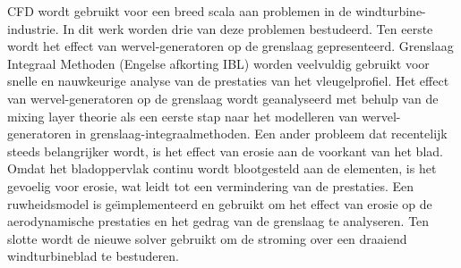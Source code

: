 {CFD wordt gebruikt voor een breed scala aan problemen in de windturbine-industrie. In dit werk worden drie van deze problemen bestudeerd. Ten eerste wordt het effect van wervel-generatoren op de grenslaag gepresenteerd. Grenslaag Integraal Methoden (Engelse afkorting IBL) worden veelvuldig gebruikt voor snelle en nauwkeurige analyse van de prestaties van het vleugelprofiel. Het effect van wervel-generatoren op de grenslaag wordt geanalyseerd met behulp van de mixing layer theorie als een eerste stap naar het modelleren van wervel-generatoren in grenslaag-integraalmethoden. Een ander probleem dat recentelijk steeds belangrijker wordt, is het effect van erosie aan de voorkant van het blad. Omdat het bladoppervlak continu wordt blootgesteld aan de elementen, is het gevoelig voor erosie, wat leidt tot een vermindering van de prestaties. Een ruwheidsmodel is ge\"{\i}mplementeerd en gebruikt om het effect van erosie op de aerodynamische prestaties en het gedrag van de  grenslaag te analyseren. Ten slotte wordt de nieuwe solver gebruikt om de stroming over een draaiend windturbineblad te bestuderen.

}

